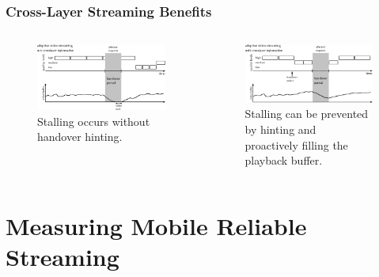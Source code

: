 \documentclass{beamer}
\begin{document}
\begin{frame}
	\frametitle{Cross-Layer Streaming Benefits}

	\begin{columns}[T]
		\begin{figure}
			\includegraphics[width=\columnwidth]{../../chapters/05-mobilestreaming/images/adaptive-streaming-no-cl.pdf}
			\caption{Stalling occurs without handover hinting.}
		\end{figure}

		\begin{figure}
			\includegraphics[width=\columnwidth]{../../chapters/05-mobilestreaming/images/adaptive-streaming-cl.pdf}
			\caption{Stalling can be prevented by hinting and proactively filling the playback buffer.}
		\end{figure}
	\end{columns}
\end{frame}


\section{Measuring Mobile Reliable Streaming}
\end{document}
